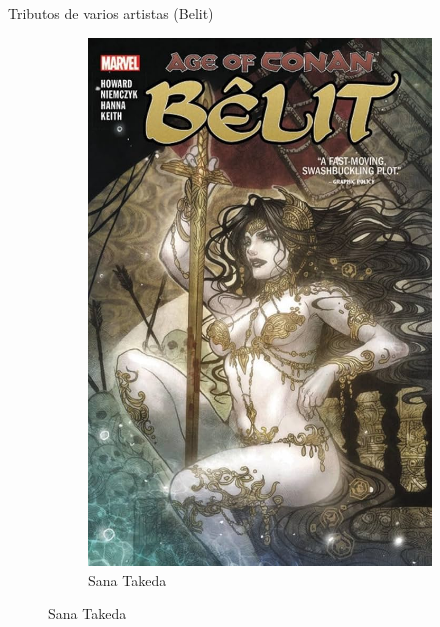 \begin{frame}{Tributos de varios artistas (Belit)}
\begin{figure}[htp]
\begin{subfigure}[b]{0.22\textwidth}
			\includegraphics[width=\textwidth]{img/tributos/SanaTakeda}
			\caption{Sana Takeda}
		\end{subfigure}
	\end{figure}
\end{frame}
\note[itemize]{
	\item
}

\begin{frame}{}
	\maketitle
\end{frame}
